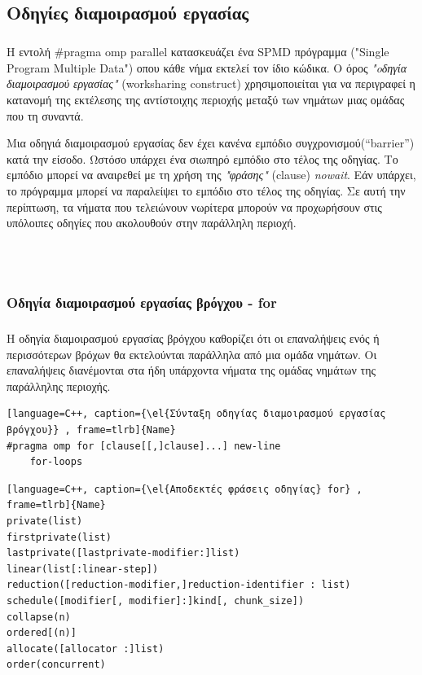\documentclass[12pt]{article}
\newcommand{\en}[1]{\foreignlanguage{english}{#1}}
\newcommand{\el}[1]{\selectlanguage{greek}{#1}\selectlanguage{english}}
\begin{document}
\subsection{Οδηγίες διαμοιρασμού εργασίας}
\subparagraph{}
Η εντολή \en{{\#}pragma omp parallel} κατασκευάζει ένα \en{SPMD} πρόγραμμα (\en{"Single Program Multiple Data"}) οπου κάθε νήμα εκτελεί τον ίδιο κώδικα. Ο όρος \emph{"oδηγία διαμοιρασμού εργασίας"} (\en{worksharing construct}) χρησιμοποιείται για να περιγραφεί η κατανομή της εκτέλεσης της αντίστοιχης περιοχής μεταξύ των νημάτων μιας ομάδας που τη συναντά.

Μια οδηγιά διαμοιρασμού εργασίας δεν έχει κανένα εμπόδιο συγχρονισμού(“\en{barrier}”) κατά την είσοδο. Ωστόσο υπάρχει ένα σιωπηρό εμπόδιο στο τέλος της οδηγίας. Το εμπόδιο μπορεί να αναιρεθεί με τη χρήση της \emph{"φράσης"} \en{(clause)} \emph{nowait}. Εάν υπάρχει, το πρόγραμμα μπορεί να παραλείψει το εμπόδιο στο τέλος της οδηγίας. Σε αυτή την περίπτωση, τα νήματα που τελειώνουν νωρίτερα μπορούν να προχωρήσουν στις υπόλοιπες οδηγίες που ακολουθούν στην παράλληλη περιοχή\cite{openmpse16}.

\ \\
\ \\
\subsubsection{Οδηγία διαμοιρασμού εργασίας βρόγχου - \en{for}}
\subparagraph{}
Η οδηγία διαμοιρασμού εργασίας βρόγχου καθορίζει ότι οι επαναλήψεις ενός ή περισσότερων βρόχων θα εκτελούνται παράλληλα από μια ομάδα νημάτων. Οι επαναλήψεις διανέμονται στα ήδη υπάρχοντα νήματα της ομάδας νημάτων της παράλληλης περιοχής.
\ \\
\begin{lstlisting}[language=C++, caption={\el{Σύνταξη οδηγίας διαμοιρασμού εργασίας βρόγχου}} , frame=tlrb]{Name}
#pragma omp for [clause[[,]clause]...] new-line
	for-loops
\end{lstlisting}
\clearpage
\begin{lstlisting}[language=C++, caption={\el{Αποδεκτές φράσεις οδηγίας} for} , frame=tlrb]{Name}
private(list)
firstprivate(list)
lastprivate([lastprivate-modifier:]list)
linear(list[:linear-step])
reduction([reduction-modifier,]reduction-identifier : list)
schedule([modifier[, modifier]:]kind[, chunk_size])
collapse(n)
ordered[(n)]
allocate([allocator :]list)
order(concurrent)
\end{lstlisting}
\end{document}
